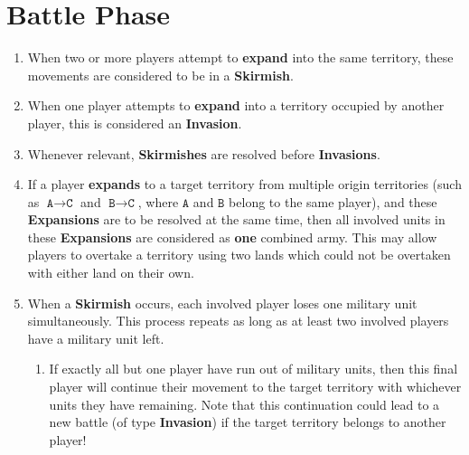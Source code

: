 \documentclass[10pt,openright,a4paper,openany]{article}
\newcommand{\term}[1]{\textbf{\color{purple} #1}}
\begin{document}
\section{Battle Phase}\label{sec:battle}
\begin{enumerate}
	\item When two or more players attempt to \term{expand} into the same territory, these movements are considered to be in a \term{Skirmish}.
	\item When one player attempts to \term{expand} into a territory occupied by another player, this is considered an \term{Invasion}.
	\item Whenever relevant, \term{Skirmishes} are resolved before \term{Invasions}.
	\item If a player \term{expands} to a target territory from multiple origin territories (such as $\texttt{A} \to \texttt{C}$ and $\texttt{B} \to \texttt{C}$, where $\texttt{A}$ and $\texttt{B}$ belong to the same player), and these \term{Expansions} are to be resolved at the same time, then all involved units in these \term{Expansions} are considered as \textbf{one} combined army. This may allow players to overtake a territory using two lands which could not be overtaken with either land on their own.
	\item \label{rule:skirmish}When a \term{Skirmish} occurs, each involved player loses one military unit simultaneously. This process repeats as long as at least two involved players have a military unit left.
	\begin{enumerate}
		\item If exactly all but one player have run out of military units, then this final player will continue their movement to the target territory with whichever units they have remaining. Note that this continuation could lead to a new battle (of type \term{Invasion}) if the target territory belongs to another player!
	\end{enumerate}

\end{enumerate}
\end{document}
